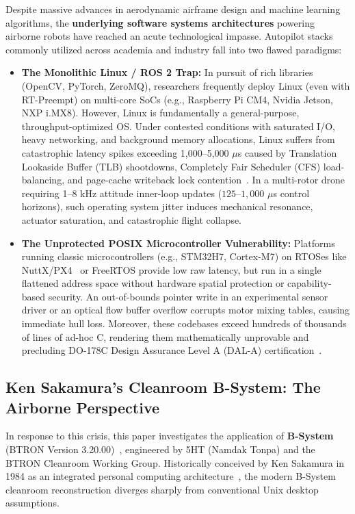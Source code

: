 \documentclass[10pt,journal,compsoc,twocolumn]{article}
\begin{document}
Despite massive advances in aerodynamic airframe design and machine learning algorithms, the \textbf{underlying software systems architectures} powering airborne robots have reached an acute technological impasse. Autopilot stacks commonly utilized across academia and industry fall into two flawed paradigms:
\begin{itemize}[leftmargin=*]
    \item \textbf{The Monolithic Linux / ROS 2 Trap:} In pursuit of rich libraries (OpenCV, PyTorch, ZeroMQ), researchers frequently deploy Linux (even with RT-Preempt) on multi-core SoCs (e.g., Raspberry Pi CM4, Nvidia Jetson, NXP i.MX8). However, Linux is fundamentally a general-purpose, throughput-optimized OS. Under contested conditions with saturated I/O, heavy networking, and background memory allocations, Linux suffers from catastrophic latency spikes exceeding 1,000--5,000 $\mu$s caused by Translation Lookaside Buffer (TLB) shootdowns, Completely Fair Scheduler (CFS) load-balancing, and page-cache writeback lock contention~\cite{cerqueira2014linux,reghenzani2019mixed}. In a multi-rotor drone requiring 1--8 kHz attitude inner-loop updates ($125\text{--}1{,}000$ $\mu$s control horizons), such operating system jitter induces mechanical resonance, actuator saturation, and catastrophic flight collapse.
    \item \textbf{The Unprotected POSIX Microcontroller Vulnerability:} Platforms running classic microcontrollers (e.g., STM32H7, Cortex-M7) on RTOSes like NuttX/PX4~\cite{meier2015px4} or FreeRTOS provide low raw latency, but run in a single flattened address space without hardware spatial protection or capability-based security. An out-of-bounds pointer write in an experimental sensor driver or an optical flow buffer overflow corrupts motor mixing tables, causing immediate hull loss. Moreover, these codebases exceed hundreds of thousands of lines of ad-hoc C, rendering them mathematically unprovable and precluding DO-178C Design Assurance Level A (DAL-A) certification~\cite{do178c}.
\end{itemize}

\subsection{Ken Sakamura's Cleanroom B-System: The Airborne Perspective}
In response to this crisis, this paper investigates the application of \textbf{B-System} (BTRON Version 3.20.00)~\cite{sokhatsky2026btron}, engineered by 5HT (Namdak Tonpa) and the BTRON Cleanroom Working Group. Historically conceived by Ken Sakamura in 1984 as an integrated personal computing architecture~\cite{sakamura1984tron,btron3spec}, the modern B-System cleanroom reconstruction diverges sharply from conventional Unix desktop assumptions. 
\end{document}
